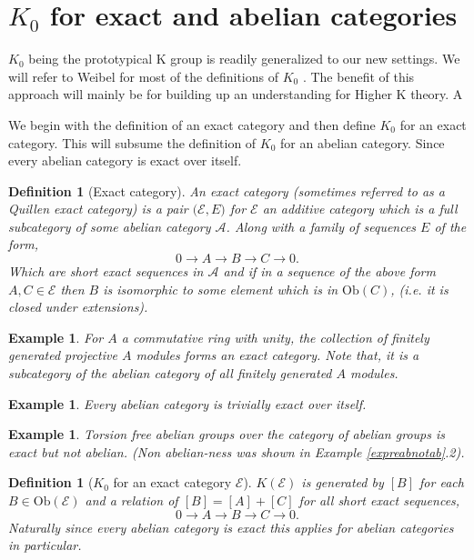 \documentclass[12pt]{report}
\numberwithin{equation}{section}
\newtheorem{definition}[dummy]{Definition}
\newtheorem{example}[dummy]{Example}
\begin{document}
	\section{$K_0$ for exact and abelian categories}
	$K_0$ being the prototypical K group is readily generalized to our new settings. We will refer to Weibel for most of the definitions of $K_0$ \cite{weibel2013k}. The benefit of this approach will mainly be for building up an understanding for Higher K theory. A
	
	We begin with the definition of an exact category and then define $K_0$ for an exact category. This will subsume the definition of $K_0$ for an abelian category. Since every abelian category is exact over itself.
	
	\begin{definition}[Exact category]
		An exact category (sometimes referred to as a Quillen exact category) is a pair $\mathcal{(E},E)$ for $\mathcal{E}$ an additive category which is a full subcategory of some abelian category $\mathcal{A}$. Along with a family of sequences $E$ of the form, \[ 0 \to A \to B \to C \to 0. \] Which are short exact sequences in $\mathcal{A}$ and if in a sequence of the above form $A, C \in \mathcal{E}$ then $B $ is isomorphic to some element which is in $\mathrm{Ob}(C)$, (i.e. it is closed under extensions).
	\end{definition}
	\begin{example}
		For \(A\) a commutative ring with unity, the collection of finitely generated projective \( A \) modules forms an exact category. Note that, it is a subcategory of the abelian category of all finitely generated \( A \) modules.
	\end{example}
	\begin{example}
		Every abelian category is trivially exact over itself.
	\end{example}
	\begin{example}Torsion free abelian groups over the category of abelian groups is exact but not abelian. (Non abelian-ness was shown in Example \ref{expreabnotab}.2).
	\end{example}
	
	\begin{definition}[$K_0$ for an exact category $\mathcal{E}$]
		$K(\mathcal E)$ is generated by $[B]$ for each $B \in \mathrm{Ob}(\mathcal{E})$ and a relation of $[B]=[A]+[C]$ for all short exact sequences, \[ 0 \to A \to B \to C \to 0.\]
		Naturally since every abelian category is exact this applies for abelian categories in particular.
	\end{definition}
	
\end{document}

